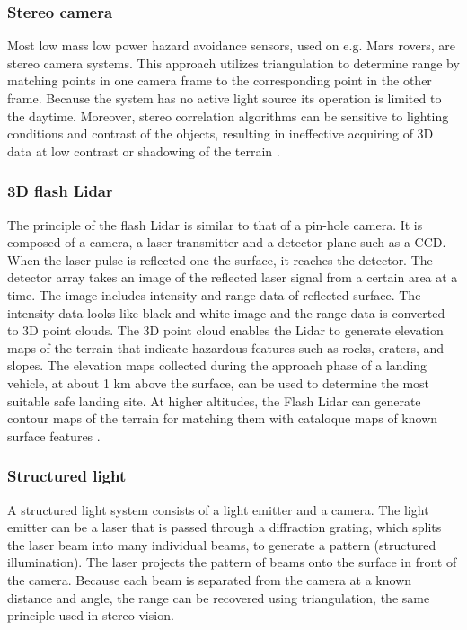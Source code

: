 \subsubsection{Stereo camera}
Most low mass low power hazard avoidance sensors, used on e.g. Mars rovers, are stereo camera systems. This approach utilizes triangulation to determine range by matching points in one camera frame to the corresponding point in the other frame. Because the system has no active light source its operation is limited to the daytime. Moreover, stereo correlation algorithms can be sensitive to lighting conditions and contrast of the objects, resulting in ineffective acquiring of 3D data at low contrast or shadowing of the terrain \cite{structuredlight}.
 

\subsubsection{3D flash Lidar}

The principle of the flash Lidar is similar to that of a pin-hole camera. It is composed of a camera, a laser transmitter and a detector plane such as a CCD. When the laser pulse is reflected one the surface, it reaches the detector. The detector array takes an image of the reflected laser signal from a certain area at a time. The image includes intensity and range data of reflected surface. The intensity data looks like black-and-white image and the range data is converted to 3D point clouds.
The 3D point cloud enables the Lidar to generate elevation maps of the terrain that indicate hazardous features such as rocks, craters, and slopes. The elevation maps collected during the approach phase of a landing vehicle, at about 1 km above the surface, can be used to determine the most suitable safe landing site. At higher altitudes, the Flash Lidar can generate contour maps of the terrain for matching them with cataloque maps of known surface features \cite{alhat}.

\subsubsection{Structured light}


A structured light system consists of a light emitter and a camera. The light emitter can be a laser that is passed through a diffraction grating, which splits the laser beam into many individual beams, to generate a pattern (structured illumination). The laser projects the pattern of beams onto the surface in front of the camera. Because each beam is separated from the camera at a known distance and angle, the range can be recovered using triangulation, the same principle used in stereo vision.  \cite{structuredlight}

